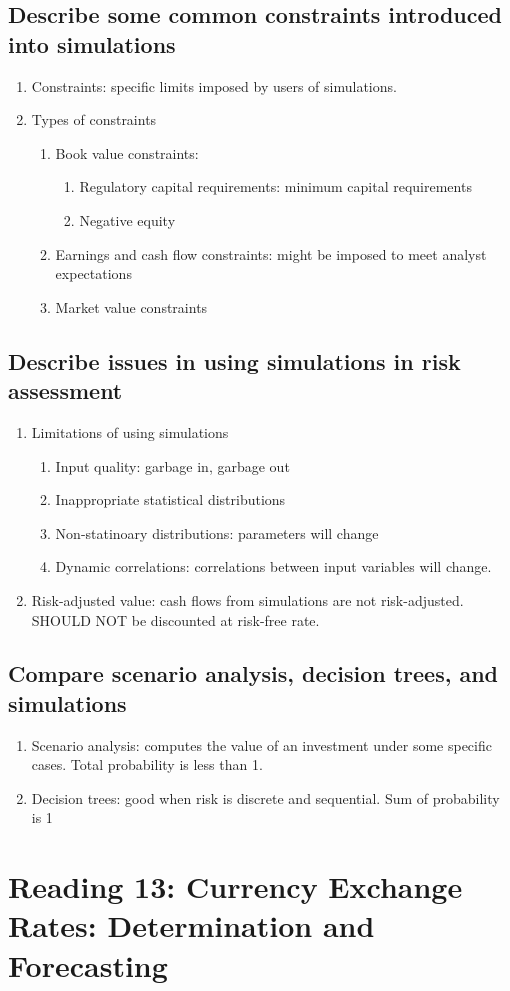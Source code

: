 \documentclass{article}
\newcommand{\be}{\begin{enumerate}}
\newcommand{\ee}{\end{enumerate}}
\begin{document}
\subsection{Describe some common constraints introduced into simulations}
\be
    \item Constraints: specific limits imposed by users of simulations.
    \item Types of constraints
        \be
            \item Book value constraints:
                \be
                    \item Regulatory capital requirements: minimum capital requirements
                    \item Negative equity
                \ee
            \item Earnings and cash flow constraints: might be imposed to meet analyst expectations
            \item Market value constraints
        \ee
\ee
\subsection{Describe issues in using simulations in risk assessment}
\be
    \item Limitations of using simulations
        \be
            \item Input quality: garbage in, garbage out
            \item Inappropriate statistical distributions
            \item Non-statinoary distributions: parameters will change
            \item Dynamic correlations: correlations between input variables will change.
        \ee
    \item Risk-adjusted value: cash flows from simulations are not risk-adjusted. 
        SHOULD NOT be discounted at risk-free rate.
\ee
\subsection{Compare scenario analysis, decision trees, and simulations}
\be
    \item Scenario analysis: computes the value of an investment under some specific cases.
        Total probability is less than 1.
    \item Decision trees: good when risk is discrete and sequential. Sum of probability is 1
\ee

\section{Reading 13: Currency Exchange Rates: Determination and Forecasting}
\end{document}
